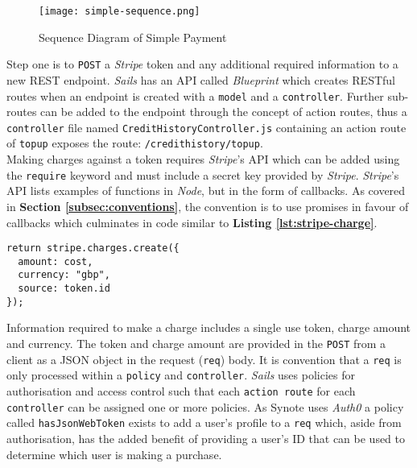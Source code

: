 \begin{figure}[!hbt]
  \centering
 	\texttt{[image: simple-sequence.png]}
  \caption{Sequence Diagram of Simple Payment}
 	\label{fig:simple-sequence}
\end{figure}

Step one is to \texttt{POST} a \textit{Stripe} token and any additional required information to a new REST endpoint. \textit{Sails} has an API called \textit{Blueprint} which creates RESTful routes when an endpoint is created with a \texttt{model} and a \texttt{controller}. Further sub-routes can be added to the endpoint through the concept of action routes, thus a \texttt{controller} file named \texttt{CreditHistoryController.js} containing an action route of \texttt{topup} exposes the route: \texttt{/credithistory/topup}.\\

Making charges against a token requires \textit{Stripe}'s API \cite{stripe-api} which can be added using the \texttt{require} keyword and must include a secret key provided by \textit{Stripe}. \textit{Stripe}'s API lists examples of functions in \textit{Node}, but in the form of callbacks. As covered in \textbf{Section \ref{subsec:conventions}}, the convention is to use promises in favour of callbacks which culminates in code similar to \textbf{Listing \ref{lst:stripe-charge}}.\\

\hspace{0.1\textwidth}
\begin{minipage}{.76\textwidth}

\begin{listing}[H]
\begin{verbatim}
return stripe.charges.create({
  amount: cost,
  currency: "gbp",
  source: token.id
});
\end{verbatim}
\label{lst:stripe-charge}
\end{listing}
\end{minipage}
\hspace{0.1\textwidth}
\vspace{0.3cm}

Information required to make a charge includes a single use token, charge amount and currency. The token and charge amount are provided in the \texttt{POST} from a client as a JSON object in the request (\texttt{req}) body. It is convention that a \texttt{req} is only processed within a \texttt{policy} and \texttt{controller}. \textit{Sails} uses policies for authorisation and access control such that each \texttt{action route} for each \texttt{controller} can be assigned one or more policies. As Synote uses \textit{Auth0} \cite{auth0} a policy called \texttt{hasJsonWebToken} exists to add a user's profile to a \texttt{req} which, aside from authorisation, has the added benefit of providing a user's ID that can be used to determine which user is making a purchase.\\

